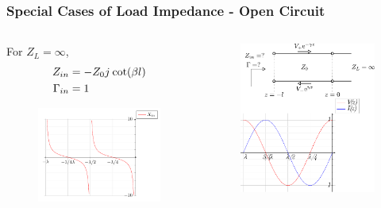 \documentclass[10pt, compress]{beamer}
\renewcommand{\j}{{j}\mkern1mu} %
\begin{document}
\begin{frame}
  \frametitle{Special Cases of Load Impedance - Open Circuit}
  \begin{columns}[T] %
    \begin{column}{.4\textwidth}
      For $Z_L = \infty$,
      \begin{align*}
        Z_{in} &=  - Z_0 \j \cot (\beta l) \\
        \Gamma_{in} &= 1 
      \end{align*}
      \begin{figure}[h!]
        \centering
        \includegraphics[width=.95\textwidth]{open_impedance.pdf}
      \end{figure}
     \end{column}
   \begin{column}[T]{.6\textwidth}
    \begin{figure}[T!]
      \centering
      \includegraphics[width=.9\textwidth]{tline_open.pdf}
      \end{figure}
        \end{column}%
  \end{columns}
\end{frame}
\end{document}
